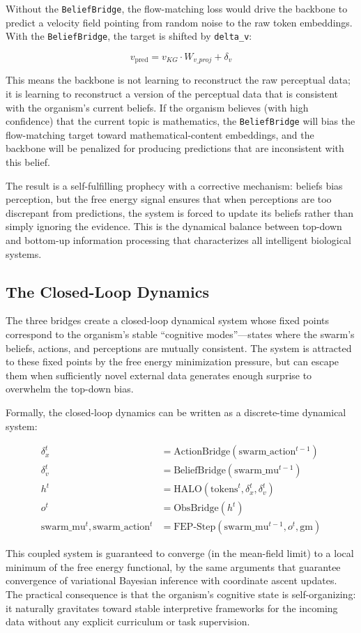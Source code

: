 Without the \texttt{BeliefBridge}, the flow-matching loss would drive the backbone to predict a velocity field pointing from random noise to the raw token embeddings. With the \texttt{BeliefBridge}, the target is shifted by \texttt{delta\_v}:

\begin{equation}
v_{\text{pred}} = v_{KG} \cdot W_{v\_proj} + \delta_v
\end{equation}

This means the backbone is not learning to reconstruct the raw perceptual data; it is learning to reconstruct a version of the perceptual data that is consistent with the organism's current beliefs. If the organism believes (with high confidence) that the current topic is mathematics, the \texttt{BeliefBridge} will bias the flow-matching target toward mathematical-content embeddings, and the backbone will be penalized for producing predictions that are inconsistent with this belief.

The result is a self-fulfilling prophecy with a corrective mechanism: beliefs bias perception, but the free energy signal ensures that when perceptions are too discrepant from predictions, the system is forced to update its beliefs rather than simply ignoring the evidence. This is the dynamical balance between top-down and bottom-up information processing that characterizes all intelligent biological systems.

\subsection{The Closed-Loop Dynamics}

The three bridges create a closed-loop dynamical system whose fixed points correspond to the organism's stable ``cognitive modes''---states where the swarm's beliefs, actions, and perceptions are mutually consistent. The system is attracted to these fixed points by the free energy minimization pressure, but can escape them when sufficiently novel external data generates enough surprise to overwhelm the top-down bias.

Formally, the closed-loop dynamics can be written as a discrete-time dynamical system:

\begin{align}
\delta_x^t &= \text{ActionBridge}(\text{swarm\_action}^{t-1}) \\
\delta_v^t &= \text{BeliefBridge}(\text{swarm\_mu}^{t-1}) \\
h^t &= \text{HALO}(\text{tokens}^t, \delta_x^t, \delta_v^t) \\
o^t &= \text{ObsBridge}(h^t) \\
\text{swarm\_mu}^t, \text{swarm\_action}^t &= \text{FEP-Step}(\text{swarm\_mu}^{t-1}, o^t, \text{gm})
\end{align}

This coupled system is guaranteed to converge (in the mean-field limit) to a local minimum of the free energy functional, by the same arguments that guarantee convergence of variational Bayesian inference with coordinate ascent updates. The practical consequence is that the organism's cognitive state is self-organizing: it naturally gravitates toward stable interpretive frameworks for the incoming data without any explicit curriculum or task supervision.
